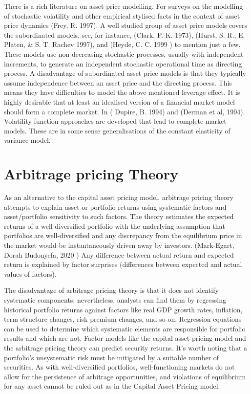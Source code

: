 \documentclass[a4 paper, 12pt]{report}
\theoremstyle{plain}
\begin{document}
\par There is a rich literature on asset price modelling. For surveys on the modelling of
stochastic volatility and other empirical stylised facts in the context of asset price
dynamics (Frey, R. 1997). A well studied group of asset price models covers the
subordinated models, see, for instance, (Clark, P. K. 1973), (Hurst, S. R., E. Platen, \& S. T.
Rachev 1997), and (Heyde, C. C. 1999 ) to mention just a few. These models use non-decreasing stochastic processes, usually with independent increments, to generate an
independent stochastic operational time as directing process. A disadvantage of
subordinated asset price models is that they typically assume independence between an
asset price and the directing process. This means they have difficulties to model the
above mentioned leverage effect. It is highly desirable that at least an idealised version of
a financial market model should form a complete market. In ( Dupire, B. 1994) and
(Derman et al, 1994). Volatility function approaches are developed that lead to complete
market models. These are in some sense generalisations of the constant elasticity of
variance model.
\section{Arbitrage pricing Theory}
\noindent
\par As an alternative to the capital asset pricing
model, arbitrage pricing theory attempts to explain asset or portfolio returns using
systematic factors and asset/portfolio sensitivity to such factors. The theory estimates
the expected returns of a well diversified portfolio with the underlying assumption that
portfolios are well-diversified and any discrepancy from the equilibrium price in the
market would be instantaneously driven away by investors. (Mark-Egart, Dorah
Budonyefa, 2020 ) Any difference between actual return and expected return is explained
by factor surprises (differences between expected and actual values of factors).\\

\par The disadvantage of arbitrage pricing theory is that it does not identify systematic
components; nevertheless, analysts can find them by regressing historical portfolio
returns against factors like real GDP growth rates, inflation, term structure changes, risk
premium changes, and so on. Regression equations can be used to determine which
systematic elements are responsible for portfolio results and which are not. Factor
models like the capital asset pricing model and the arbitrage pricing theory can predict
security returns. It's worth noting that a portfolio's unsystematic risk must be mitigated
by a suitable number of securities. As with well-diversified portfolios, well-functioning
markets do not allow for the persistence of arbitrage opportunities, and violations of
equilibrium for any asset cannot be ruled out as in the Capital Asset Pricing model.\\
\end{document}
